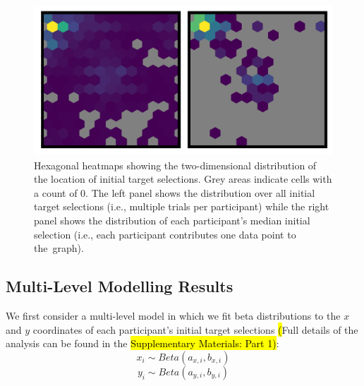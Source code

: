 \documentclass[vision,article,accept,pdftex,moreauthors]{Definitions/mdpi}
\begin{document}
\begin{figure}[H]
\includegraphics[width=12 cm]{Figures/init_sel_hex_plot.pdf}
\caption{Hexagonal heatmaps showing the two-dimensional distribution of the location of initial target selections. Grey areas indicate cells with a count of 0. The left panel shows the distribution over all initial target selections (i.e., multiple trials per participant) while the right panel shows the distribution of each participant's median initial selection (i.e., each participant contributes one data point to the~graph). }%

\label{fig:qjep_init_sel_hex}
\end{figure} 

\subsection{Multi-Level Modelling Results}

We first consider a multi-level model in which we fit beta distributions to the $x$ and $y$ coordinates of each participant's initial target selections \hl{(}Full details of the analysis can be found in the \hl{Supplementary Materials: Part 1}\hl{)}:%
\begin{equation}
    x_i \sim Beta(a_{x,i}, b_{x,i})
    \label{eq:beta1x}
\end{equation}
\begin{equation}
    y_i \sim Beta(a_{y,i}, b_{y,i})
    \label{eq:beta1y}
\end{equation}
\end{document}
